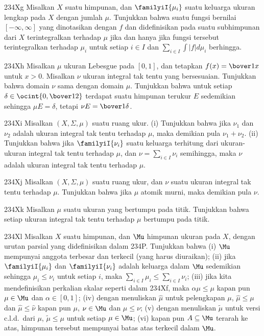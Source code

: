 {\spheader 234Xg
 Misalkan $X$ suatu himpunan, dan $\familyiI{\mu_i}$ suatu keluarga
ukuran lengkap pada $X$ dengan jumlah $\mu$.
Tunjukkan bahwa suatu fungsi bernilai $[-\infty,\infty]$ yang dinotasikan
dengan $f$ dan didefinisikan pada suatu subhimpunan dari $X$ terintegralkan terhadap $\mu$
jika dan hanya jika fungsi tersebut terintegralkan terhadap $\mu_i$ untuk
setiap $i\in I$ dan $\sum_{i\in I}\int|f|d\mu_i$ berhingga.

\spheader 234Xh
Misalkan $\mu$ ukuran Lebesgue pada $[0,1]$, dan tetapkan
$f(x)=\bover1x$ untuk $x>0$. Misalkan $\nu$ ukuran integral tak tentu
yang bersesuaian. Tunjukkan bahwa domain $\nu$ sama dengan domain $\mu$.
Tunjukkan bahwa untuk setiap $\delta\in\ocint{0,\bover12}$ terdapat
suatu himpunan terukur $E$ sedemikian sehingga
$\mu E=\delta$, tetapi $\nu E=\bover1{\delta}$.

\spheader 234Xi
 Misalkan $(X,\Sigma,\mu)$ suatu ruang ukur. (i) Tunjukkan bahwa jika
$\nu_1$ dan $\nu_2$ adalah ukuran integral tak tentu terhadap $\mu$,
maka demikian pula $\nu_1+\nu_2$. (ii) Tunjukkan bahwa jika
$\familyiI{\nu_i}$ suatu keluarga terhitung dari ukuran-ukuran integral
tak tentu terhadap $\mu$, dan $\nu=\sum_{i\in I}\nu_i$ semihingga, maka
$\nu$ adalah ukuran integral tak tentu terhadap $\mu$.

\spheader 234Xj
 Misalkan $(X,\Sigma,\mu)$ suatu ruang ukur, dan $\nu$ suatu ukuran
integral tak tentu terhadap $\mu$. Tunjukkan bahwa jika $\mu$ atomik
murni, maka demikian pula $\nu$.

\spheader 234Xk
 Misalkan $\mu$ suatu ukuran yang bertumpu pada titik. Tunjukkan bahwa
setiap ukuran integral tak tentu terhadap $\mu$ bertumpu pada titik.

\spheader 234Xl
 Misalkan $X$ suatu himpunan, dan $\Mu$ himpunan ukuran pada $X$, dengan
urutan parsial yang didefinisikan dalam 234P. Tunjukkan bahwa
(i) $\Mu$ mempunyai anggota terbesar dan terkecil (yang harus diuraikan);
(ii) jika $\familyiI{\mu_i}$ dan $\familyiI{\nu_i}$ adalah keluarga
dalam $\Mu$ sedemikian sehingga $\mu_i\le\nu_i$ untuk setiap $i$, maka
$\sum_{i\in I}\mu_i\le\sum_{i\in I}\nu_i$; (iii) jika kita mendefinisikan
perkalian skalar seperti dalam 234Xf, maka $\alpha\mu\le\mu$ kapan pun
$\mu\in\Mu$ dan $\alpha\in[0,1]$; (iv) dengan menuliskan $\hat\mu$ untuk
pelengkapan $\mu$, $\hat\mu\le\mu$ dan $\hat\mu\le\hat\nu$ kapan pun
$\mu$, $\nu\in\Mu$ dan $\mu\le\nu$; (v) dengan menuliskan $\tilde\mu$
untuk versi c.l.d.\ dari $\mu$, $\tilde\mu\le\mu$ untuk setiap
$\mu\in\Mu$; (vi) kapan pun $A\subseteq\Mu$ terarah ke atas, himpunan
tersebut mempunyai batas atas terkecil dalam $\Mu$.

}

